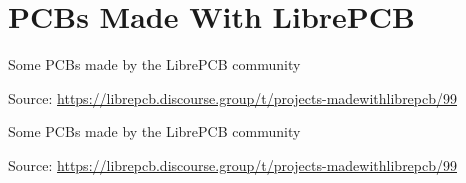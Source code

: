 \section{PCBs Made With LibrePCB}

\begin{frame}{\secname}

  Some PCBs made by the LibrePCB community \faChild\faChild\faChild

  \begin{center}

    \tiny Source:
    \url{https://librepcb.discourse.group/t/projects-madewithlibrepcb/99}
  \end{center}

\end{frame}

\begin{frame}[noframenumbering]{\secname}

  Some PCBs made by the LibrePCB community \faChild\faChild\faChild

  \begin{center}

    \tiny Source:
    \url{https://librepcb.discourse.group/t/projects-madewithlibrepcb/99}
  \end{center}

\end{frame}

